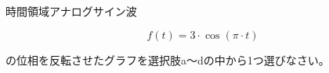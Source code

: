 時間領域アナログサイン波

\[
f(t) =3 \cdot \cos( \pi \cdot t )
\]

\bigskip
\noindent  の位相を反転させたグラフを選択肢a〜dの中から1つ選びなさい。
